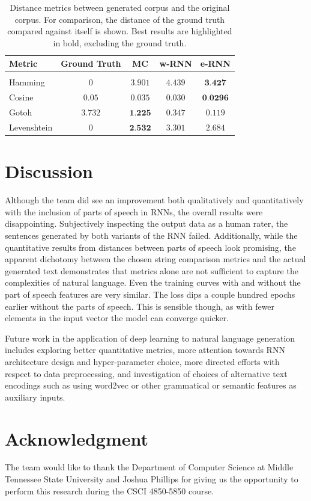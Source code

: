 \documentclass[conference]{IEEEtran}
\begin{document}
\begin{table}[!htbp]
\caption{Distance metrics between generated corpus and the original corpus.  For comparison, the distance of the ground truth compared against itself is shown.  Best results are highlighted in bold, excluding the ground truth.}
\label{tab:results_table}
\begin{center}
\begin{tabular}{lcccc}

Metric & Ground Truth & MC & w-RNN & e-RNN\\
\hline{}\\
Hamming & $0$ & $3.901$ & $4.439$ & $\textbf{3.427}$\\
Cosine & $0.05$ & $0.035$ & $0.030$ & $\textbf{0.0296}$\\
Gotoh & $3.732$ & $\textbf{1.225}$ & $0.347$ & $0.119$\\
Levenshtein & $0$ & $\textbf{2.532}$ & $3.301$ & $2.684$\\

\end{tabular}
\end{center}
\vspace{-1em}
\end{table}


\section{Discussion}

Although the team did see an improvement both qualitatively and quantitatively with the inclusion of parts of speech in RNNs, the overall results were disappointing. Subjectively inspecting the output data as a human rater, the sentences generated by both variants of the RNN failed. Additionally, while the quantitative results from distances between parts of speech look promising, the apparent dichotomy between the chosen string comparison metrics and the actual generated text demonstrates that metrics alone are not sufficient to capture the complexities of natural language. Even the training curves with and without the part of speech features are very similar. The loss dips a couple hundred epochs earlier without the parts of speech. This is sensible though, as with fewer elements in the input vector the model can converge quicker.

Future work in the application of deep learning to natural language generation includes exploring better quantitative metrics, more attention towards RNN architecture design and hyper-parameter choice, more directed efforts with respect to data preprocessing, and investigation of choices of alternative text encodings such as using word2vec or other grammatical or semantic features as auxiliary inputs. 

\section*{Acknowledgment}

The team would like to thank the Department of Computer Science at Middle Tennessee State University and Joshua Phillips for giving us the opportunity to perform this research during the CSCI 4850-5850 course.




\end{document}
